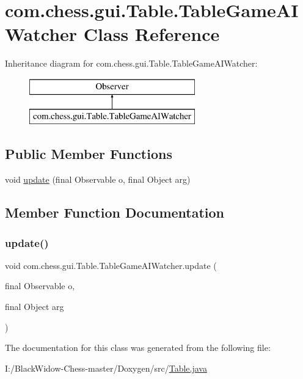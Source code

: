 \hypertarget{classcom_1_1chess_1_1gui_1_1_table_1_1_table_game_a_i_watcher}{}\section{com.\+chess.\+gui.\+Table.\+Table\+Game\+A\+I\+Watcher Class Reference}
\label{classcom_1_1chess_1_1gui_1_1_table_1_1_table_game_a_i_watcher}
Inheritance diagram for com.\+chess.\+gui.\+Table.\+Table\+Game\+A\+I\+Watcher\+:\begin{figure}[H]
\begin{center}
\leavevmode
\includegraphics[height=2.000000cm]{classcom_1_1chess_1_1gui_1_1_table_1_1_table_game_a_i_watcher}
\end{center}
\end{figure}
\subsection*{Public Member Functions}
\begin{DoxyCompactItemize}
\item 
void \mbox{\hyperlink{classcom_1_1chess_1_1gui_1_1_table_1_1_table_game_a_i_watcher_ae47e2798e044fbb0ae144c3b1a6f2023}{update}} (final Observable o, final Object arg)
\end{DoxyCompactItemize}


\subsection{Member Function Documentation}
\mbox{\label{classcom_1_1chess_1_1gui_1_1_table_1_1_table_game_a_i_watcher_ae47e2798e044fbb0ae144c3b1a6f2023}} 
\subsubsection{\texorpdfstring{update()}{update()}}
{\footnotesize\ttfamily void com.\+chess.\+gui.\+Table.\+Table\+Game\+A\+I\+Watcher.\+update (\begin{DoxyParamCaption}\item[{final Observable}]{o,  }\item[{final Object}]{arg }\end{DoxyParamCaption})}



The documentation for this class was generated from the following file\+:\begin{DoxyCompactItemize}
\item 
I\+:/\+Black\+Widow-\/\+Chess-\/master/\+Doxygen/src/\mbox{\hyperlink{_table_8java}{Table.\+java}}\end{DoxyCompactItemize}

